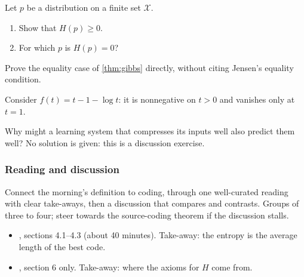 \documentclass[11pt]{article}
\begin{document}
\begin{exercise}
\label{ex:warmup}
Let $p$ be a distribution on a finite set $\mathcal{X}$.
\begin{enumerate}
  \item Show that $H(p) \geq 0$.
        \label{ex:warmup-a}
  \item For which $p$ is $H(p) = 0$?
\end{enumerate}
\end{exercise}


\begin{exercise}
\label{ex:gibbs-hard}
\important
Prove the equality case of \cref{thm:gibbs} directly, without citing Jensen's
equality condition. 
\end{exercise}

\begin{hint}
Consider $f(t) = t - 1 - \log t$: it is nonnegative on $t > 0$ and vanishes
only at $t = 1$.
\end{hint}

\begin{exercise}
\label{ex:open}
Why might a learning system that compresses its inputs well also predict
them well? No solution is given: this is a discussion exercise.
\end{exercise}

\subsubsection{Reading and discussion}
\label{sec:reading}

\begin{teachingnote}[Intent]
Connect the morning's definition to coding, through one well-curated
reading with clear take-aways, then a discussion that compares and
contrasts. Groups of three to four; steer towards the source-coding theorem
if the discussion stalls.
\end{teachingnote}

\begin{itemize}
  \item \cite[ch.~4]{MacKay:03}, sections 4.1--4.3 (about 40 minutes).
        Take-away: the entropy is the average length of the best code.
  \item \cite{Shannon:48}, section 6 only. Take-away: where the axioms for
        $H$ come from.
\end{itemize}
\end{document}
